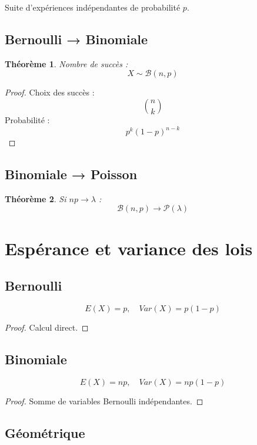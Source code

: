 \documentclass[11pt,a4paper]{article}
\newtheorem{theorem}{Théorème}
\begin{document}
Suite d’expériences indépendantes de probabilité $p$.

\subsection{Bernoulli → Binomiale}

\begin{theorem}
Nombre de succès :
\[
X \sim \mathcal{B}(n,p)
\]
\end{theorem}

\begin{proof}
Choix des succès :
\[
\binom{n}{k}
\]
Probabilité :
\[
p^k(1-p)^{n-k}
\]
\end{proof}

\subsection{Binomiale → Poisson}

\begin{theorem}
Si $np \to \lambda$ :
\[
\mathcal{B}(n,p) \to \mathcal{P}(\lambda)
\]
\end{theorem}

\section{Espérance et variance des lois}

\subsection{Bernoulli}

\[
E(X)=p,\quad Var(X)=p(1-p)
\]

\begin{proof}
Calcul direct.
\end{proof}

\subsection{Binomiale}

\[
E(X)=np,\quad Var(X)=np(1-p)
\]

\begin{proof}
Somme de variables Bernoulli indépendantes.
\end{proof}

\subsection{Géométrique}
\end{document}
